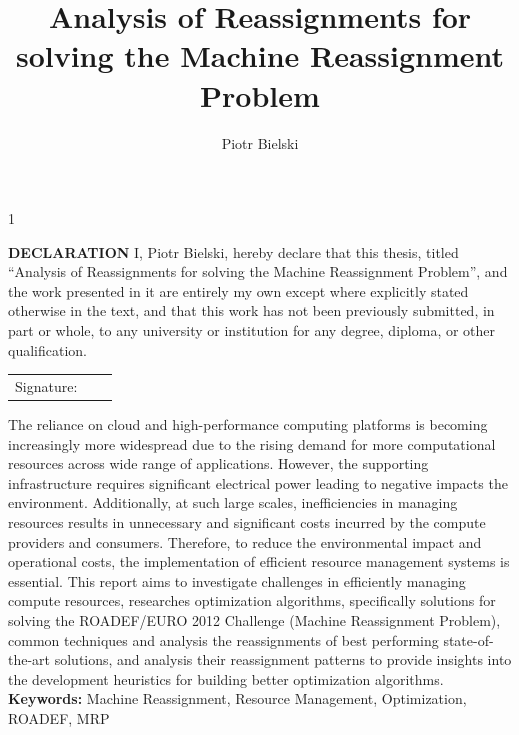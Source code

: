 \documentclass[a4paper,12pt]{Classes/RoboticsLaTeX}
\title{\Large{Analysis of Reassignments for solving the Machine Reassignment Problem}}
\author{Piotr Bielski}
\begin{document}
    
\begin{spacing}{1}
    \maketitle
\end{spacing}
	
\newpage\null\thispagestyle{empty}\newpage
	
\setcounter{secnumdepth}{3}
\setcounter{tocdepth}{3}
	
\frontmatter
	
\textbf{DECLARATION} 
I, Piotr Bielski, hereby declare that this thesis, titled ``Analysis of Reassignments for solving the Machine Reassignment Problem'', and the work presented in it are entirely my own except where explicitly stated otherwise in the text, and that this work has not been previously submitted, in part or whole, to any university or institution for any degree, diploma, or other qualification. 
\newline
    
\begin{tabular}{@{}p{.5in}p{4in}@{}}
    Signature: & ~~\hrulefill \\
\end{tabular}
\newpage
	
%
%



\begin{abstracts}

The reliance on cloud and high-performance computing platforms is becoming increasingly more widespread due to the rising demand for more computational resources across wide range of applications.
However, the supporting infrastructure requires significant electrical power leading to negative impacts the environment. Additionally, at such large scales, inefficiencies in managing resources results in unnecessary and significant costs incurred by the compute providers and consumers.
Therefore, to reduce the environmental impact and operational costs, the implementation of efficient resource management systems is essential. 
This report aims to investigate challenges in efficiently managing compute resources, researches optimization algorithms, specifically solutions for solving the ROADEF/EURO 2012 Challenge (Machine Reassignment Problem), common techniques and analysis the reassignments of best performing state-of-the-art solutions, and analysis their reassignment patterns to provide insights into the development heuristics for building better optimization algorithms.
\newline
\newline
\textbf{Keywords:} Machine Reassignment, Resource Management, Optimization, ROADEF, MRP

\end{abstracts}
\end{document}

